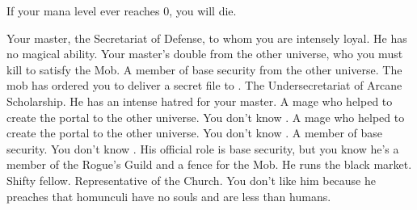 \documentclass[char]{guildcamp3}
\begin{document}
\begin{itemz}[Notes]
  \item If your mana level ever reaches 0, you will die.
\end{itemz}


\begin{contacts}
  \contact{\cNobleOne{}} Your master, the Secretariat of Defense, to whom you are intensely loyal. He has no magical ability.
  \contact{\cPoliOne{}} Your master's double from the other universe, who you must kill to satisfy the Mob.
  \contact{\cSpecOpTwo{}} A member of base security from the other universe. The mob has ordered you to deliver a secret file to \cSpecOpTwo{\them}. 
  \contact{\cNobleTwo{}} The Undersecretariat of Arcane Scholarship. He has an intense hatred for your master.
  \contact{\cMageOne{}} A mage who helped to create the portal to the other universe. You don't know \cMageOne{\them}.
  \contact{\cMageTwo{}} A mage who helped to create the portal to the other universe. You don't know \cMageTwo{\them}.
  \contact{\cRogueOne{}} A member of base security. You don't know \cRogueOne{\them}.
  \contact{\cRogueTwo{}} His official role is base security, but you know he's a member of the Rogue's Guild and a fence for the Mob. He runs the black market. Shifty fellow.
  \contact{\cPaladin{}} Representative of the Church. You don't like him because he preaches that homunculi have no souls and are less than humans.
\end{contacts}
\end{document}
